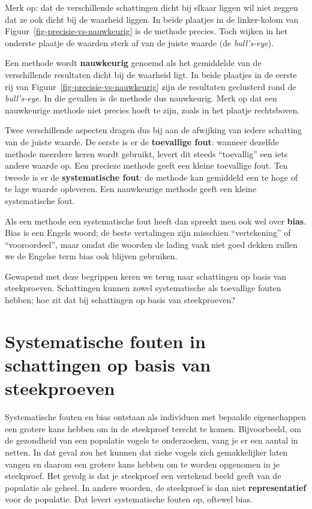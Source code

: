 \documentclass[
  a4paper,
]{scrbook}
\theoremstyle{definition}
\theoremstyle{definition}
\theoremstyle{remark}
\begin{document}
Merk op: dat de verschillende schattingen dicht bij elkaar liggen wil
niet zeggen dat ze ook dicht bij de waarheid liggen. In beide plaatjes
in de linker-kolom van Figuur~\ref{fig-precisie-vs-nauwkeurig} is de
methode precies. Toch wijken in het onderste plaatje de waarden sterk af
van de juiste waarde (de \emph{bull's-eye}).

Een methode wordt \textbf{nauwkeurig} genoemd als het gemiddelde van de
verschillende resultaten dicht bij de waarheid ligt. In beide plaatjes
in de eerste rij van Figuur~\ref{fig-precisie-vs-nauwkeurig} zijn de
resultaten geclusterd rond de \emph{bull's-eye}. In die gevallen is de
methode dus nauwkeurig. Merk op dat een nauwkeurige methode niet precies
hoeft te zijn, zoals in het plaatje rechtsboven.

Twee verschillende aspecten dragen dus bij aan de afwijking van iedere
schatting van de juiste waarde. De eerste is er de \textbf{toevallige
fout}: wanneer dezelfde methode meerdere keren wordt gebruikt, levert
dit steeds ``toevallig'' een iets andere waarde op. Een precieze methode
geeft een kleine toevallige fout. Ten tweede is er de
\textbf{systematische fout}: de methode kan gemiddeld een te hoge of te
lage waarde opleveren. Een nauwkeurige methode geeft een kleine
systematische fout.

Als een methode een systematische fout heeft dan spreekt men ook wel
over \textbf{bias}. Bias is een Engels woord; de beste vertalingen zijn
misschien ``vertekening'' of ``vooroordeel'', maar omdat die woorden de
lading vaak niet goed dekken zullen we de Engelse term bias ook blijven
gebruiken.

Gewapend met deze begrippen keren we terug naar schattingen op basis van
steekproeven. Schattingen kunnen zowel systematische als toevallige
fouten hebben; hoe zit dat bij schattingen op basis van steekproeven?

\section{Systematische fouten in schattingen op basis van
steekproeven}\label{systematische-fouten-in-schattingen-op-basis-van-steekproeven}

Systematische fouten en bias ontstaan als individuen met bepaalde
eigenschappen een grotere kans hebben om in de steekproef terecht te
komen. Bijvoorbeeld, om de gezondheid van een populatie vogels te
onderzoeken, vang je er een aantal in netten. In dat geval zou het
kunnen dat zieke vogels zich gemakkelijker laten vangen en daarom een
grotere kans hebben om te worden opgenomen in je steekproef. Het gevolg
is dat je steekproef een vertekend beeld geeft van de populatie als
geheel. In andere woorden, de steekproef is dan niet
\textbf{representatief} voor de populatie. Dat levert systematische
fouten op, oftewel bias.
\end{document}
